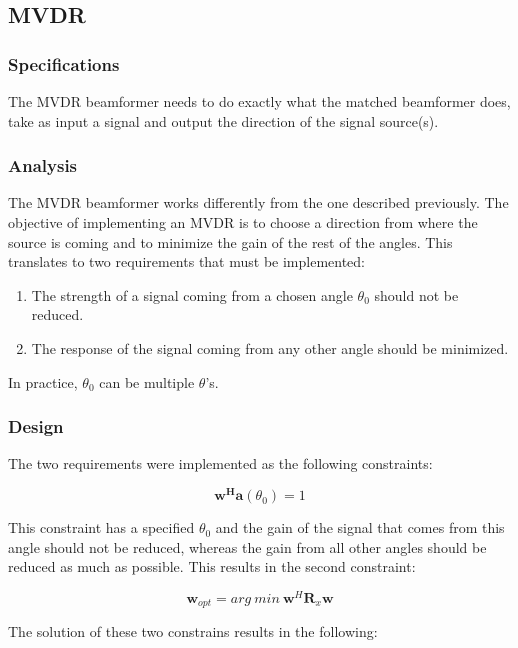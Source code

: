 \subsection{MVDR}
\subsubsection{Specifications}
The MVDR beamformer needs to do exactly what the matched beamformer does, take as input a signal and output the direction of the signal source(s).

\subsubsection{Analysis}
The MVDR beamformer works differently from the one described previously. The objective of implementing an MVDR is to choose a direction from where the source is coming and to minimize the gain of the rest of the angles. This translates to two requirements that must be implemented:
\begin{enumerate}
\item The strength of a signal coming from a chosen angle $\theta_0$ should not be reduced.
\item The response of the signal coming from any other angle should be minimized.
\end{enumerate}
In practice, $\theta_0$ can be multiple $\theta$'s.

\subsubsection{Design}


The two requirements were implemented as the following constraints:

\begin{equation}
\textbf{w}^\textbf{H}\textbf{a}(\theta_0)=1
\end{equation}

\noindent This constraint has a specified $\theta_0$ and the gain of the signal that comes from this angle should not be reduced, whereas the gain from all other angles should be reduced as much as possible. This results in the second constraint:

\begin{equation}
\textbf{w}_{opt}=arg\: min\:\textbf{w}^\textit{H}\textbf{R}_x\textbf{w}
\end{equation}


\noindent The solution of these two constrains results in the following:

